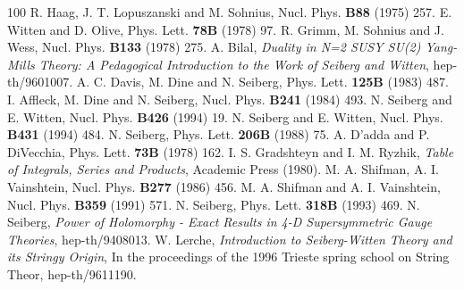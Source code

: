 \begin{thebibliography}{100}
R. Haag, J. T. Lopuszanski and M. Sohnius, Nucl. Phys. {\bf B88}
(1975) 257.
E. Witten and D. Olive, Phys. Lett. {\bf 78B} (1978) 97.
R. Grimm, M. Sohnius and J. Wess, Nucl. Phys. {\bf B133} (1978) 275.
A. Bilal, {\it Duality in N=2 SUSY SU(2) Yang-Mills Theory: A
Pedagogical Introduction to the Work of Seiberg and Witten},
hep-th/9601007. 
A. C. Davis, M. Dine and N. Seiberg, Phys. Lett. {\bf 125B} (1983) 487.
I. Affleck, M. Dine and N. Seiberg, Nucl. Phys. {\bf B241} (1984) 493.
N. Seiberg and E. Witten, Nucl. Phys. {\bf B426} (1994) 19.
N. Seiberg and E. Witten, Nucl. Phys. {\bf B431} (1994) 484. 
N. Seiberg, Phys. Lett. {\bf 206B} (1988) 75.
A. D'adda and P. DiVecchia, Phys. Lett. {\bf 73B} (1978) 162.
I. S. Gradshteyn and I. M. Ryzhik, {\it Table of Integrals, Series and
Products}, Academic Press (1980).
M. A. Shifman, A. I. Vainshtein, Nucl. Phys. {\bf B277} (1986) 456.
M. A. Shifman and A. I. Vainshtein, Nucl. Phys. {\bf B359} (1991) 571.
N. Seiberg, Phys. Lett. {\bf 318B} (1993) 469.
N. Seiberg, {\it Power of Holomorphy - Exact Results in 4-D
Supersymmetric Gauge Theories}, hep-th/9408013. 
W. Lerche, {\it Introduction to Seiberg-Witten Theory and its Stringy
  Origin}, In the proceedings of the 1996 Trieste spring school on
String Theor, hep-th/9611190.  
\end{thebibliography}
